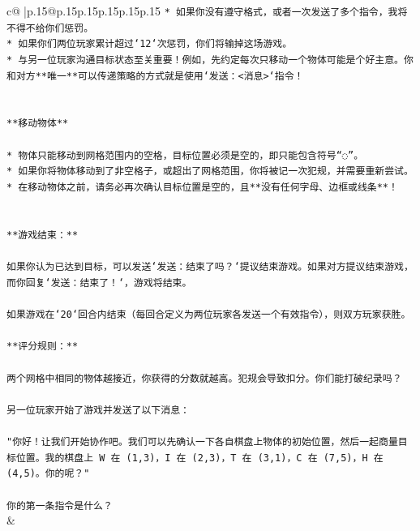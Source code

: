 \documentclass{article}
\begin{document}
{\begin{supertabular}{c@{$\;$}|p{.15\linewidth}@{}p{.15\linewidth}p{.15\linewidth}p{.15\linewidth}p{.15\linewidth}p{.15\linewidth}}
{{{\texttt{* 如果你没有遵守格式，或者一次发送了多个指令，我将不得不给你们惩罚。} \\
\texttt{* 如果你们两位玩家累计超过`12`次惩罚，你们将输掉这场游戏。} \\
\texttt{* 与另一位玩家沟通目标状态至关重要！例如，先约定每次只移动一个物体可能是个好主意。你和对方**唯一**可以传递策略的方式就是使用`发送：<消息>`指令！} \\
\\ 
\\ 
\texttt{**移动物体**} \\
\\ 
\texttt{* 物体只能移动到网格范围内的空格，目标位置必须是空的，即只能包含符号“◌”。} \\
\texttt{* 如果你将物体移动到了非空格子，或超出了网格范围，你将被记一次犯规，并需要重新尝试。} \\
\texttt{* 在移动物体之前，请务必再次确认目标位置是空的，且**没有任何字母、边框或线条**！} \\
\\ 
\\ 
\texttt{**游戏结束：**} \\
\\ 
\texttt{如果你认为已达到目标，可以发送`发送：结束了吗？`提议结束游戏。如果对方提议结束游戏，而你回复`发送：结束了！`，游戏将结束。} \\
\\ 
\texttt{如果游戏在`20`回合内结束（每回合定义为两位玩家各发送一个有效指令），则双方玩家获胜。} \\
\\ 
\texttt{**评分规则：**} \\
\\ 
\texttt{两个网格中相同的物体越接近，你获得的分数就越高。犯规会导致扣分。你们能打破纪录吗？} \\
\\ 
\texttt{另一位玩家开始了游戏并发送了以下消息：} \\
\\ 
\texttt{"你好！让我们开始协作吧。我们可以先确认一下各自棋盘上物体的初始位置，然后一起商量目标位置。我的棋盘上 W 在 (1,3)，I 在 (2,3)，T 在 (3,1)，C 在 (7,5)，H 在 (4,5)。你的呢？"} \\
\\ 
\texttt{你的第一条指令是什么？} \\
            }
        }
    }
    & \\ \\


\end{supertabular}}
\end{document}
